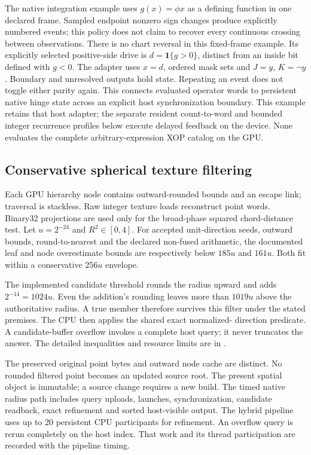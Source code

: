 The native integration example uses $g(x)=\phi x$ as a defining function in
one declared frame. Sampled endpoint nonzero sign changes produce explicitly
numbered events; this policy does not claim to recover every continuous
crossing between observations. There is no chart reversal in this fixed-frame
example. Its explicitly selected positive-side drive is $d=\boldsymbol1\{g>0\}$,
distinct from an inside bit defined with $g<0$. The adapter uses $x=d$,
ordered mask sets and $J=y$,
$K=\neg y$. Boundary and unresolved outputs hold state. Repeating an event
does not toggle either parity again. This connects evaluated operator words
to persistent native hinge state across an explicit host synchronization
boundary. This example retains that host adapter; the separate resident
count-to-word and bounded integer recurrence profiles below execute delayed
feedback on the device. None evaluates the complete arbitrary-expression XOP
catalog on the GPU.

\subsection{Conservative spherical texture filtering}
Each GPU hierarchy node contains outward-rounded bounds and an escape link;
traversal is stackless. Raw integer texture loads reconstruct point words.
Binary32 projections are used only for the broad-phase squared chord-distance
test. Let $u=2^{-24}$ and $R^2\in[0,4]$. For accepted unit-direction seeds,
outward bounds, round-to-nearest and the declared non-fused arithmetic, the
documented leaf and node overestimate bounds are respectively below $185u$
and $161u$. Both fit within a conservative $256u$ envelope.

The implemented candidate threshold rounds the radius upward and adds
$2^{-14}=1024u$. Even the addition's rounding leaves more than $1019u$
above the authoritative radius. A true member therefore survives this filter
under the stated premises. The CPU then applies the shared exact normalized-
direction predicate. A candidate-buffer overflow invokes a complete host
query; it never truncates the answer. The detailed inequalities and resource
limits are in .

The preserved original point bytes and outward node cache are distinct. No
rounded filtered point becomes an updated source root. The present spatial
object is immutable; a source change requires a new build. The timed native
radius path includes query uploads, launches, synchronization, candidate readback,
exact refinement and sorted host-visible output.
The hybrid pipeline uses up to 20 persistent CPU participants for refinement.
An overflow query is rerun completely on the host index. That work and its
thread participation are recorded with the pipeline timing.

